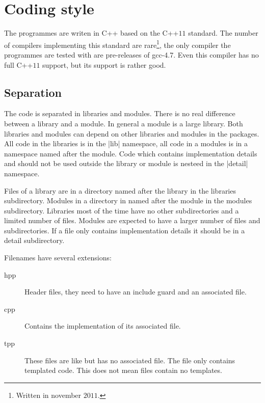 \chapter{Coding style}
\label{chapter:coding_style}

The programmes are writen in \mbox{C++} based on the \mbox{C++$11$}
standard. The number of compilers implementing this standard are
rare\footnote{Written in november $2011$.}, the only compiler the programmes
are tested with are pre-releases of \mbox{gcc-4.7}. Even this compiler has
no full \mbox{C++$11$} support, but its support is rather good.


\section{Separation}

The code is separated in libraries and modules. There is no real difference
between a library and a module. In general a module is a large library. Both
libraries and modules can depend on other libraries and modules in the
packages. All code in the libraries is in the \command|lib| namespace, all
code in a modules is in a namespace named after the module. Code which
contains implementation details and should not be used outside the library
or module is nesteed in the \command|detail| namespace.

Files of a library are in a directory named after the library in the
libraries subdirectory. Modules in a directory in named after the module in
the modules subdirectory. Libraries most of the time have no other
subdirectories and a limited number of files. Modules are expected to have a
larger number of files and subdirectories. If a file only contains
implementation details it should be in a detail subdirectory.


Filenames have several extensions:
\begin{description}
\item[hpp]\label{file:hpp}
	Header files, they need to have an include guard and an associated
	 file.

\item[cpp]\label{file:cpp}
	Contains the implementation of its associated  file.

\item[tpp]
	These files are like  but has no associated
	 file. The file only contains templated code. This
	does not mean  files contain no templates.

\end{description}

